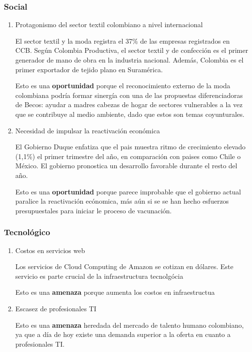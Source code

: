 \documentclass[11pt]{article}
\begin{document}
\subsubsection{Social}
\label{sec:org12d2e36}
\begin{enumerate}
\item Protagonismo del sector textil colombiano a nivel internacional
\label{sec:orgbda6197}

El sector textil y la moda registra el 37\% de las empresas registrados en CCB.
Según Colombia Productiva, el sector textil y de confección es el primer
generador de mano de obra en la industria nacional. Además, Colombia es el
primer exportador de tejido plano en Suramérica.

Esto es una \textbf{oportunidad} porque el reconocimiento externo de la moda colombiana
podría formar sinergía con una de las propuestas diferenciadoras de Becos:
ayudar a madres cabezas de hogar de sectores vulnerables a la vez que se
contribuye al medio ambiente, dado que estos son temas coyunturales.

\item Necesidad de impulsar la reactivación económica
\label{sec:orge503cd2}

El Gobierno Duque enfatiza que el pais muestra ritmo de crecimiento
elevado (1,1\%) el primer trimestre del año, en comparación con paises
como Chile o México. El gobierno pronostica un desarrollo favorable
durante el resto del año.

Esto es una \textbf{oportunidad} porque parece improbable que el gobierno
actual paralice la reactivación ecónomica, más aún si se se han hecho
esfuerzos presupuestales para iniciar le proceso de vacunación.
\end{enumerate}

\subsubsection{Tecnológico}
\label{sec:org553a00d}
\begin{enumerate}
\item Costos en servicios web
  \label{sec:org7f15774}
  
Los servicios de Cloud Computing de Amazon se cotizan en dólares.
Este servicio es parte crucial de la infraestructura tecnolgócia

Esto es una \textbf{amenaza} porque aumenta los costos en infraestructua
\item Escasez de profesionales TI
\label{sec:org933a81f}

Esto es una \textbf{amenaza} heredada del mercado de talento humano
colombiano, ya que a día de hoy existe una demanda superior a la
oferta en cuanto a profesionales TI.
\end{enumerate}
\end{document}
